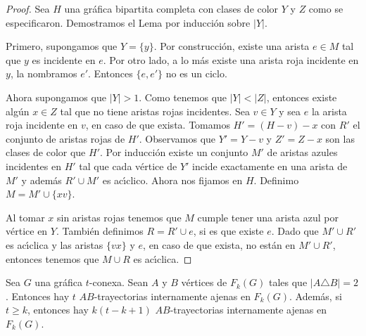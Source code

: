 \begin{proof}
    Sea $H$ una gr\'afica bipartita completa con clases de color $Y$ y $Z$ como
    se especificaron. Demostramos el Lema por inducci\'on sobre $|Y|$. 

    Primero, supongamos que $Y=\{y\}$. Por construcci\'on, existe una arista $e
    \in M$ tal que $y$ es incidente en $e$. Por otro lado, a lo m\'as existe una
    arista roja incidente en $y$, la nombramos $e'$. Entonces $\{e, e'\}$ no es
    un ciclo.

    Ahora supongamos que $|Y|>1$. Como tenemos que $|Y|<|Z|$, entonces existe
    alg\'un $x \in Z$ tal que no tiene aristas rojas incidentes. Sea $v \in Y$ y
    sea $e$ la arista roja incidente en $v$, en caso de que exista. Tomamos $H'=
    (H-v)-x$ con $R'$ el conjunto de aristas rojas de $H'$. Observamos que $Y' =
    Y- v$ y $Z'= Z- x$ son las clases de color que $H'$. Por inducci\'on existe
    un conjunto $M'$ de aristas azules incidentes en $H'$ tal que cada v\'ertice
    de $Y'$ incide exactamente en una arista de $M'$ y adem\'as $R'\cup M'$ es
    ac\'\i{}clico. Ahora nos fijamos en $H$. Definimo $M= M'\cup \{xv\}$.

    Al tomar $x$ sin aristas rojas tenemos que $M$ cumple tener una arista azul
    por v\'ertice en $Y$. Tambi\'en definimos $R= R'\cup e$, si es que existe
    $e$.  Dado que  $M'\cup R'$ es ac\'\i{}clica y las aristas $\{vx\}$ y $e$,
    en caso de que exista, no est\'an en $M'\cup R'$, entonces tenemos que $M
    \cup R$ es ac\'\i{}clica.
\end{proof}

\begin{lema}%
\label{lem:tercero}
    Sea $G$ una gr\'afica $t$-conexa. Sean $A$ y $B$ v\'ertices de
    $F_{k}(G)$ tales que $|A \triangle B| = 2$. Entonces hay $t$
    $AB$-trayectorias internamente ajenas en $F_{k}(G)$. Adem\'as, si
    $t \geq k$, entonces hay $k(t- k + 1)$ $AB$-trayectorias
    internamente ajenas en $F_{k}(G)$.
\end{lema}

